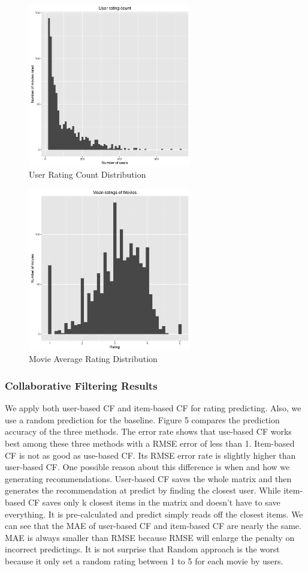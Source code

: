 \documentclass[conference]{IEEEtran}
\begin{document}
\begin{figure}
	\centering
	\includegraphics[width=2.8in]{user_rating.png}
	\caption{User Rating Count Distribution}
	\label{fig:side:a}
\end{figure}

\begin{figure}
	\centering
	\includegraphics[width=2.8in]{movie_rating.png}
	\caption{Movie Average Rating Distribution}
	\label{fig:side:a}
\end{figure}

\subsubsection{Collaborative Filtering Results}
We apply both user-based CF and item-based CF for rating predicting. Also, we use a random prediction for the baseline. Figure 5 compares the prediction accuracy of the three methods. The  error rate shows that use-based CF works best among these three methods with a RMSE error of less than 1. Item-based CF is not as good as use-based CF. Its RMSE error rate is slightly higher than user-based CF. One possible reason about this difference is when and how we generating recommendations. User-based CF saves the whole matrix and then generates the recommendation at predict by finding the closest user. While item-based CF saves only k closest items in the matrix and doesn’t have to save everything. It is pre-calculated and predict simply reads off the closest items. We can see that the MAE of user-based CF and item-based CF are nearly the same. MAE is always smaller than RMSE because RMSE will enlarge the penalty on incorrect predictings. It is not surprise that Random approach is the worst because it only set a random rating between 1 to 5 for each movie by users.
\end{document}
